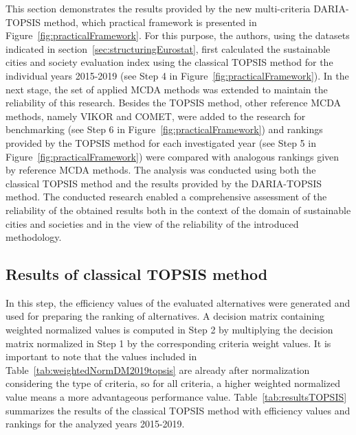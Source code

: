 \documentclass[5p,times]{elsarticle}
\begin{document}
This section demonstrates the results provided by the new multi-criteria DARIA-TOPSIS method, which practical framework is presented in Figure~\ref{fig:practicalFramework}. For this purpose, the authors, using the datasets indicated in section~\ref{sec:structuringEurostat}, first calculated the sustainable cities and society evaluation index using the classical TOPSIS method for the individual years 2015-2019 (see Step 4 in Figure~\ref{fig:practicalFramework}). In the next stage, the set of applied MCDA methods was extended to maintain the reliability of this research. Besides the TOPSIS method, other reference MCDA methods, namely VIKOR and COMET, were added to the research for benchmarking (see Step 6 in Figure~\ref{fig:practicalFramework}) and rankings provided by the TOPSIS method for each investigated year (see Step 5 in Figure~\ref{fig:practicalFramework}) were compared with analogous rankings given by reference MCDA methods. The analysis was conducted using both the classical TOPSIS method and the results provided by the DARIA-TOPSIS method. The conducted research enabled a comprehensive assessment of the reliability of the obtained results both in the context of the domain of sustainable cities and societies and in the view of the reliability of the introduced methodology.

\subsection{Results of classical TOPSIS method}
\label{sec:resultsClassicalTOPSIS}

In this step, the efficiency values of the evaluated alternatives were generated and used for preparing the ranking of alternatives. A decision matrix containing weighted normalized values is computed in Step 2 by multiplying the decision matrix normalized in Step 1 by the corresponding criteria weight values. It is important to note that the values included in Table~\ref{tab:weightedNormDM2019topsis} are already after normalization considering the type of criteria, so for all criteria, a higher weighted normalized value means a more advantageous performance value. Table~\ref{tab:resultsTOPSIS} summarizes the results of the classical TOPSIS method with efficiency values and rankings for the analyzed years 2015-2019.
\end{document}
